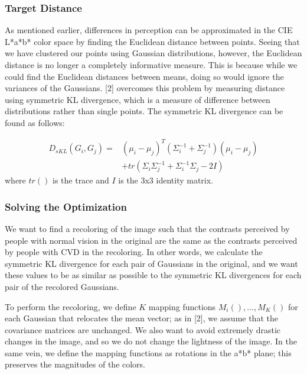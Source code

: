 \documentclass[10pt,twocolumn,letterpaper]{article}
\begin{document}
\subsubsection{Target Distance}
As mentioned earlier, differences in perception can be approximated in the CIE L*a*b* color space by finding the Euclidean distance between points. Seeing that we have clustered our points using Gaussian distributions, however, the Euclidean distance is no longer a completely informative measure. This is because while we could find the Euclidean distances between means, doing so would ignore the variances of the Gaussians. [2] overcomes this problem by measuring distance using symmetric KL divergence, which is a measure of difference between distributions rather than single points. The symmetric KL divergence can be found as follows:

\begin{align*}
  D_{sKL}(G_i, G_j) = &(\mu_i - \mu_j)^T (\Sigma_i^{-1} + \Sigma_j^{-1}) (\mu_i - \mu_j) \\
  &+ tr(\Sigma_i \Sigma_j^{-1} + \Sigma_i^{-1} \Sigma_j - 2I)
\end{align*}
where $tr()$ is the trace and $I$ is the 3x3 identity matrix. 

\subsubsection{Solving the Optimization}
We want to find a recoloring of the image such that the contrasts perceived by people with normal vision in the original are the same as the contrasts perceived by people with CVD in the recoloring. In other words, we calculate the symmetric KL divergence for each pair of Gaussians in the original, and we want these values to be as similar as possible to the symmetric KL divergences for each pair of the recolored Gaussians. 

To perform the recoloring, we define $K$ mapping functions $M_i(), ..., M_K()$ for each Gaussian that relocates the mean vector; as in [2], we assume that the covariance matrices are unchanged. We also want to avoid extremely drastic changes in the image, and so we do not change the lightness of the image. In the same vein, we define the mapping functions as rotations in the a*b* plane; this preserves the magnitudes of the colors. 
\end{document}
